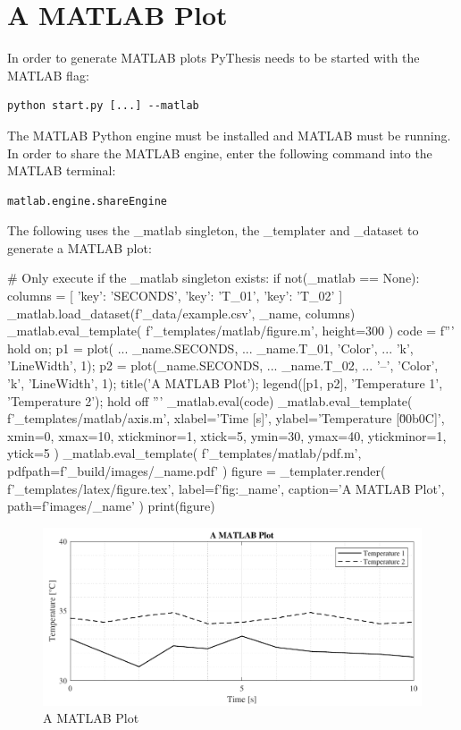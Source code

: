 \documentclass[a4paper]{book}
\begin{document}
\section{A MATLAB Plot}
\label{sec:a-matlab-plot}
In order to generate MATLAB plots PyThesis needs to be started with the MATLAB flag:
\begin{verbatim}
python start.py [...] --matlab
\end{verbatim}
The MATLAB Python engine must be installed and MATLAB must be running. In order to share the MATLAB engine, enter the following command into the MATLAB terminal:
\begin{verbatim}
matlab.engine.shareEngine
\end{verbatim}
The following uses the \_matlab singleton, the \_templater and \_dataset to generate a MATLAB plot:  
\begin{python}
# Only execute if the _matlab singleton exists:
if not(_matlab == None):
    columns = [
        {'key': 'SECONDS'},
        {'key': 'T_01'},
        {'key': 'T_02'}
    ]
    _matlab.load_dataset(f'{_data}/example.csv', _name, columns)
    _matlab.eval_template(
        f'{_templates}/matlab/figure.m',
        height=300
    )
    code = f'''
        hold on;
        p1 = plot( ...
            {_name}.SECONDS, ...
            {_name}.T_01, 'Color',  ...
            'k', 'LineWidth', 1);
        p2 = plot({_name}.SECONDS, ...
            {_name}.T_02, ...
            '--', 'Color', 'k', 'LineWidth', 1);
        title('A MATLAB Plot');
        legend([p1, p2], 'Temperature 1', 'Temperature 2');
        hold off
    '''
    _matlab.eval(code)
    _matlab.eval_template(
        f'{_templates}/matlab/axis.m',
        xlabel='Time [s]',
        ylabel='Temperature [\u00b0C]',
        xmin=0,
        xmax=10,
        xtickminor=1,
        xtick=5,
        ymin=30,
        ymax=40,
        ytickminor=1,
        ytick=5
    )
    _matlab.eval_template(
        f'{_templates}/matlab/pdf.m',
        pdfpath=f'{_build}/images/{_name}.pdf'
    )
figure = _templater.render(
    f'{_templates}/latex/figure.tex',
    label=f'fig:{_name}',
    caption='A MATLAB Plot',
    path=f'images/{_name}'
)
print(figure)

\end{python}
\begin{figure}[H]
\begin{center}
  \includegraphics[width=\textwidth]{images/a_matlab_plot}
  \caption{A MATLAB Plot}
  \label{fig:a_matlab_plot}
\end{center}
\end{figure}
\printbibliography
\end{document}
